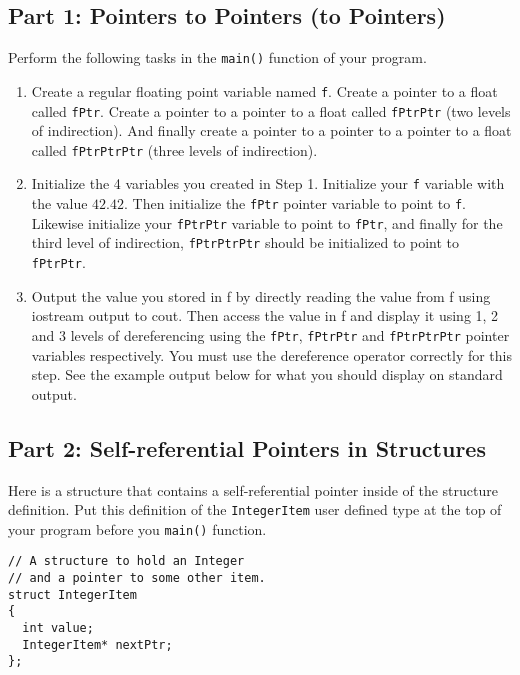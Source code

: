 \documentclass[11pt]{article}
\begin{document}
\subsection*{Part 1: Pointers to Pointers (to Pointers)}
\label{sec-3-1}

Perform the following tasks in the \verb~main()~ function of your program.

\begin{enumerate}
\item Create a regular floating point variable named \verb~f~.  Create a
   pointer to a float called \verb~fPtr~.  Create a pointer to a pointer
   to a float called \verb~fPtrPtr~ (two levels of indirection).  And
   finally create a pointer to a pointer to a pointer to a float
   called \verb~fPtrPtrPtr~ (three levels of indirection).
\item Initialize the 4 variables you created in Step 1.  Initialize
   your \verb~f~ variable with the value $42.42$.  Then initialize
   the \verb~fPtr~ pointer variable to point to \verb~f~.  Likewise initialize
   your \verb~fPtrPtr~ variable to point to \verb~fPtr~, and finally for the
   third level of indirection, \verb~fPtrPtrPtr~ should be initialized
   to point to \verb~fPtrPtr~.
\item Output the value you stored in f by directly reading the value from
   f using iostream output to cout.  Then access the value in f and
   display it using 1, 2 and 3 levels of dereferencing using the
   \verb~fPtr~, \verb~fPtrPtr~ and \verb~fPtrPtrPtr~ pointer variables respectively.
   You must use the dereference operator correctly for this step.
   See the example output below for what you should display on standard output.
\end{enumerate}
\subsection*{Part 2: Self-referential Pointers in Structures}
\label{sec-3-2}

Here is a structure that contains a self-referential pointer inside of
the structure definition.  Put this definition of the \verb~IntegerItem~
user defined type at the top of your program before you \verb~main()~
function.


\begin{verbatim}
// A structure to hold an Integer
// and a pointer to some other item.
struct IntegerItem
{
  int value;
  IntegerItem* nextPtr;
};
\end{verbatim}
\end{document}
